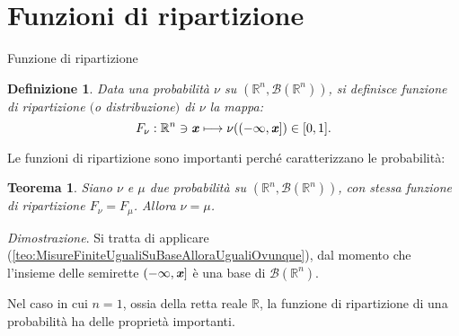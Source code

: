 \documentclass[11pt]{book}
\makeatletter
\theoremstyle{Definizione}
\newtheorem*{mydef}{Definizione}
\theoremstyle{TeoremaProposizioneLemmaCorollario}
\newtheorem{myteo}{Teorema}[section]
\theoremstyle{OsservazioneNota}
\renewenvironment{proof}[1][\proofname]{\par
  \normalfont \topsep6\p@\@plus6\p@\relax
  \trivlist
  \item[\hskip\labelsep
        \itshape
    #1\@addpunct{.}]\ignorespaces
}{%
  \endtrivlist\@endpefalse
}
\newcommand{\R}{\mathbb{R}}
\newcommand{\gri}[1]{\textbf{\textit{{#1}}}}
\renewenvironment{proof}{\textsl{Dimostrazione}.}{}
\makeatother
\begin{document}
\section{Funzioni di ripartizione}
\begin{boxdef}{Funzione di ripartizione}
\begin{mydef}
Data una probabilità $\nu$ su $(\R^n,\mathcal{B}(\R^n))$, si definisce funzione di ripartizione $($o distribuzione$)$ di $\nu$ la mappa:
$$
F_\nu: \R^n\ni\gri{x}\longmapsto \nu((-\infty,\gri{x}])\in [0,1].
$$
\end{mydef}
\end{boxdef}
\noindent
Le funzioni di ripartizione sono importanti perché caratterizzano le probabilità:
\begin{boxteo}{}
\begin{myteo}
Siano $\nu$ e $\mu$ due probabilità su $(\R^n,\mathcal{B}(\R^n))$, con stessa funzione di ripartizione $F_\nu = F_\mu$. Allora $\nu = \mu$.
\end{myteo}
\tcblower
\begin{proof}
Si tratta di applicare (\ref{teo:MisureFiniteUgualiSuBaseAlloraUgualiOvunque}), dal momento che l'insieme delle semirette $(-\infty,\gri{x}]$ è una base di $\mathcal{B}(\R^n)$.
\end{proof}
\end{boxteo}
\noindent
Nel caso in cui $n = 1$, ossia della retta reale $\R$, la funzione di ripartizione di una probabilità ha delle proprietà importanti.
\end{document}

